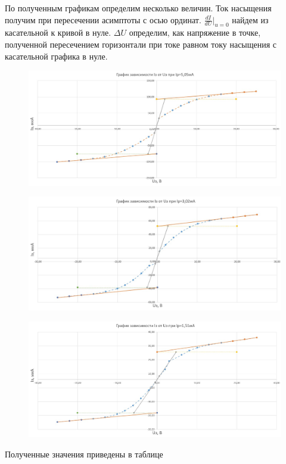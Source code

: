 \documentclass[a4paper,12pt]{article}
\begin{document}
По полученным графикам определим несколько величин. Ток насыщения получим при пересечении асимптоты с осью ординат. $\frac{dI}{dU}|_{u=0}$ найдем из касательной к кривой в нуле. $\Delta U$ определим, как напряжение в точке, полученной пересечением горизонтали при токе равном току насыщения с касательной графика в нуле.

\begin{figure}[H]
	\begin{center}    		
    		\includegraphics[width=1\textwidth]{graphik2.jpg}
    	\end{center}
\end{figure}

\begin{figure}[H]
	\begin{center}    		
    		\includegraphics[width=1\textwidth]{graphik3.jpg}
    	\end{center}
\end{figure}

\begin{figure}[H]
	\begin{center}    		
    		\includegraphics[width=1\textwidth]{graphik4.jpg}
    	\end{center}
\end{figure}
\newpage
Полученные значения приведены в таблице
\end{document}
